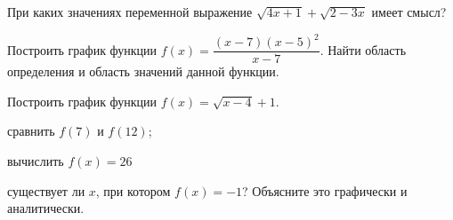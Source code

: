 \begin{class}[number=1]
\begin{listofex}
		\item При каких значениях переменной выражение \( \sqrt{4x+1}+\sqrt{2-3x} \) имеет смысл?
		\item Построить график функции \( f(x)=\dfrac{(x-7)(x-5)^2}{x-7} \). Найти область определения и область значений данной функции.
		\item Построить график функции \( f(x)=\sqrt{x-4}+1 \).
		\begin{enumcols}[itemcolumns=1]
			\item сравнить \( f(7) \) и \( f(12) \);
			\item вычислить \( f(x)=26 \)
			\item существует ли \( x \), при котором \( f(x)=-1 \)? Объясните это графически и аналитически.
		\end{enumcols}
	\end{listofex}
\end{class}
%
%

